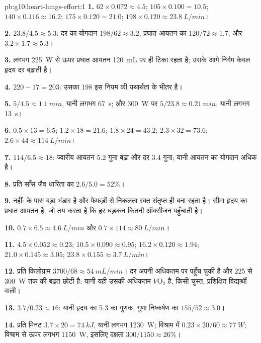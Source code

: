 \begin{solution}{pb:g10:heart-lungs-effort:1}
\textbf{1.} $62 \times 0.072 \approx 4.5$; $105 \times 0.100 = 10.5$;
$140 \times 0.116 \approx 16.2$; $175 \times 0.120 = 21.0$;
$198 \times 0.120 \approx \qty{23.8}{L/min}$।

\textbf{2.} $23.8/4.5 \approx 5.3$: दर का योगदान $198/62
\approx 3.2$, प्रघात आयतन का $120/72 \approx 1.7$, और $3.2 \times
1.7 \approx 5.3$।

\textbf{3.} लगभग \qty{225}{W} से ऊपर प्रघात आयतन \qty{120}{mL} पर ही
टिका रहता है; उसके आगे निर्गम केवल हृदय दर बढ़ाती है।

\textbf{4.} $220 - 17 = 203$: उसका 198 इस नियम की यथार्थता के भीतर है।

\textbf{5.} $5/4.5 \approx \qty{1.1}{min}$, यानी लगभग \qty{67}{s}; और
\qty{300}{W} पर $5/23.8 \approx \qty{0.21}{min}$, यानी लगभग \qty{13}{s}।

\textbf{6.} $0.5 \times 13 = 6.5$; $1.2 \times 18 = 21.6$; $1.8 \times
24 = 43.2$; $2.3 \times 32 = 73.6$; $2.6 \times 44 \approx
\qty{114}{L/min}$।

\textbf{7.} $114/6.5 \approx 18$: ज्वारीय आयतन 5.2 गुना बढ़ा और दर 3.4
गुना; यानी आयतन का योगदान अधिक है।

\textbf{8.} प्रति साँस जैव धारिता का $2.6/5.0 = 52\%$।

\textbf{9.} नहीं:  के पास बड़ा भंडार है और फेफड़ों से निकलता रक्त
संतृप्त ही बना रहता है। सीमा हृदय का प्रघात आयतन है, जो तय करता है कि हर
धड़कन कितनी ऑक्सीजन पहुँचाती है।

\textbf{10.} $0.7 \times 6.5 \approx \qty{4.6}{L/min}$ और $0.7 \times
114 \approx \qty{80}{L/min}$।

\textbf{11.} $4.5 \times 0.052 \approx 0.23$; $10.5 \times 0.090
\approx 0.95$; $16.2 \times 0.120 \approx 1.94$; $21.0 \times 0.145
\approx 3.05$; $23.8 \times 0.155 \approx \qty{3.7}{L/min}$।

\textbf{12.} प्रति किलोग्राम $3700/68 \approx \qty{54}{mL/min}$। दर
अपनी अधिकतम पर पहुँच चुकी है और 225 से \qty{300}{W} तक की बढ़त छोटी है:
यानी यही उसकी अधिकतम $\dot V\!\mathrm{O_2}$ है, किसी चुस्त, प्रशिक्षित
विद्यार्थी वाली।

\textbf{13.} $3.7/0.23 \approx 16$: यानी हृदय का 5.3 का गुणक, गुणा
निष्कर्षण का $155/52 \approx 3.0$।

\textbf{14.} प्रति मिनट $3.7 \times 20 = \qty{74}{kJ}$, यानी लगभग
\qty{1230}{W}; विश्राम में $0.23 \times 20/60 \approx \qty{77}{W}$;
विश्राम से ऊपर लगभग \qty{1150}{W}, इसलिए दक्षता $300/1150 \approx
26\%$।


\end{solution}
